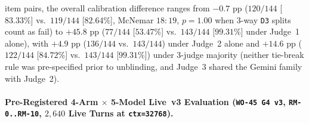 \documentclass[11pt,a4paper]{article}
\begin{document}
item pairs, the overall calibration difference ranges from $-0.7\text{ pp}$ ($120/144$ [$83.33\%$] vs.\ $119/144$ [$82.64\%$], McNemar $18:19$, $p = 1.00$ when 3-way \texttt{D3} splits count as fail) to $+45.8\text{ pp}$ ($77/144$ [$53.47\%$] vs.\ $143/144$ [$99.31\%$] under Judge~1 alone), with $+4.9\text{ pp}$ ($136/144$ vs.\ $143/144$) under Judge~2 alone and $+14.6\text{ pp}$ ($122/144$ [$84.72\%$] vs.\ $143/144$ [$99.31\%$]) under 3-judge majority (neither tie-break rule was pre-specified prior to unblinding, and Judge~3 shared the Gemini family with Judge~2).

\paragraph{Pre-Registered 4-Arm $\times$ 5-Model Live~v3 Evaluation (\texttt{WO-45 G4 v3}, \texttt{RM-0..RM-10}, $2{,}640$ Live Turns at \texttt{ctx=32768}).}
\end{document}
